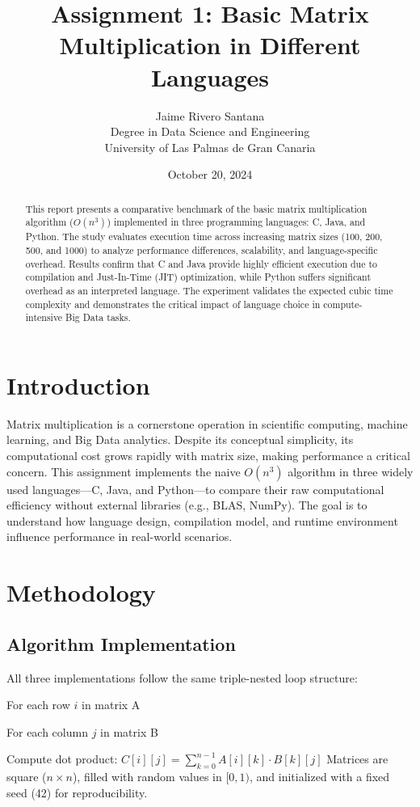 \documentclass[12pt]{article}
\title{Assignment 1: Basic Matrix Multiplication in Different Languages}
\author{Jaime Rivero Santana \\ Degree in Data Science and Engineering \\ University of Las Palmas de Gran Canaria}
\date{October 20, 2024}
\begin{document}
\maketitle

\begin{abstract}
This report presents a comparative benchmark of the basic matrix multiplication algorithm ($O(n^3)$) implemented in three programming languages: C, Java, and Python. The study evaluates execution time across increasing matrix sizes (100, 200, 500, and 1000) to analyze performance differences, scalability, and language-specific overhead. Results confirm that C and Java provide highly efficient execution due to compilation and Just-In-Time (JIT) optimization, while Python suffers significant overhead as an interpreted language. The experiment validates the expected cubic time complexity and demonstrates the critical impact of language choice in compute-intensive Big Data tasks.
\end{abstract}

\section{Introduction}
Matrix multiplication is a cornerstone operation in scientific computing, machine learning, and Big Data analytics. Despite its conceptual simplicity, its computational cost grows rapidly with matrix size, making performance a critical concern. This assignment implements the naive $O(n^3)$ algorithm in three widely used languages—C, Java, and Python—to compare their raw computational efficiency without external libraries (e.g., BLAS, NumPy). The goal is to understand how language design, compilation model, and runtime environment influence performance in real-world scenarios.

\section{Methodology}
\subsection{Algorithm Implementation}
All three implementations follow the same triple-nested loop structure:
\item For each row $i$ in matrix A
    \item For each column $j$ in matrix B
    \item Compute dot product: $C[i][j] = \sum_{k=0}^{n-1} A[i][k] \cdot B[k][j]$
Matrices are square ($n \times n$), filled with random values in $[0, 1)$, and initialized with a fixed seed (42) for reproducibility.
\end{document}

